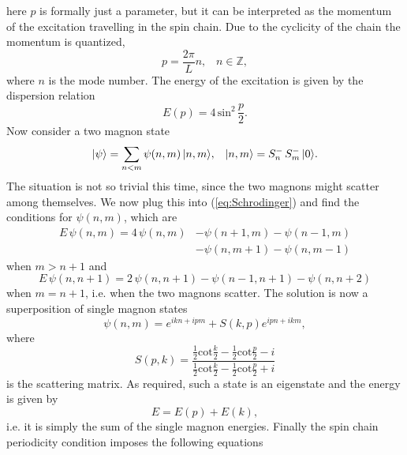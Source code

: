 here $p$ is formally just a parameter, but it can be interpreted as the momentum of the excitation travelling in the spin chain. 
Due to the cyclicity of the chain the momentum is quantized,
\begin{equation}
	p = \frac{2\pi}{L} n, \,\,\,\,\, n \in \mathbb{Z},
\end{equation}
where $n$ is the mode number. 
The energy of the excitation is given by the dispersion relation
\begin{equation}
	E(p) = 4 \, \mathrm{sin}^2 \, \frac{p}{2}.
	\label{eq:magnon_energy}
\end{equation}
Now consider a two magnon state
\begin{equation}
	|\psi\rangle = \sum_{n<m} \psi(n, m) \, |n,m\rangle,  \,\,\,\,\, |n,m\rangle = S^-_n \, S^-_m \, |0\rangle.
\end{equation}
The situation is not so trivial this time, since the two magnons might scatter among themselves. We now plug this into (\ref{eq:Schrodinger}) and find the conditions for $\psi(n,m)$, which are
\begin{equation}
\begin{split}
	E \, \psi(n,m) = 4 \, \psi(n,m) & -  \psi(n+1,m)  -  \psi(n-1,m) \\ 
	                              & -  \psi(n, m+1)  -  \psi(n, m-1)
\end{split}
\end{equation}
when $m > n+1$ and
\begin{equation}
	E \, \psi(n, n+1) = 2 \, \psi(n, n+1) - \psi(n-1, n+1) - \psi(n, n+2)
\end{equation}
when $m = n+1$, i.e. when the two magnons scatter. 
The solution is now a superposition of single magnon states
\begin{equation}
	\psi(n,m) = e^{ikn + ipm} + S(k,p) e^{ipn + ikm},
\end{equation}
where
\begin{equation}
	S(p,k) = \frac{\frac{1}{2} \mathrm{cot} \frac{k}{2} - \frac{1}{2} \mathrm{cot} \frac{p}{2} - i}{\frac{1}{2} \mathrm{cot} \frac{k}{2} - \frac{1}{2} \mathrm{cot} \frac{p}{2} + i}
\end{equation}
is the scattering matrix. 
As required, such a state is an eigenstate and the energy is given by
\begin{equation}
	E = E(p) + E(k),
\end{equation}
i.e. it is simply the sum of the single magnon energies. 
Finally the spin chain periodicity condition imposes the following equations
